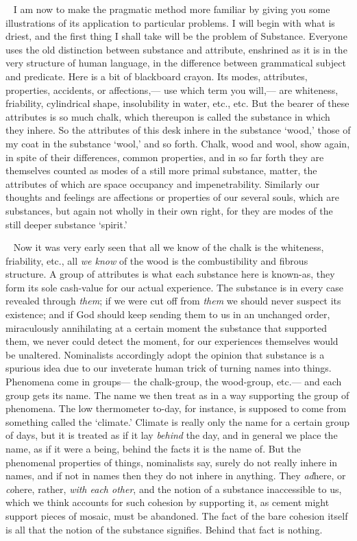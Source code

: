 \documentclass[12pt]{article}
\newcounter{wjparagraph}[section]
\newcommand*{\wjparagraph}{\stepcounter{wjparagraph}~\marginpar{\tiny\arabic{wjparagraph} }}
\begin{document}
\wjparagraph
I am now to make the pragmatic method more familiar by giving you some illustrations of its application to particular problems. I will begin with what is driest, and the first thing I shall take will be the problem of Substance. Everyone uses the old distinction between substance and attribute, enshrined as it is in the very structure of human language, in the difference between grammatical subject and predicate. Here is a bit of blackboard crayon. Its modes, attributes, properties, accidents, or affections,--- use which term you will,--- are whiteness, friability, cylindrical shape, insolubility in water, etc., etc. But the bearer of these attributes is so much chalk, which thereupon is called the substance in which they inhere. So the attributes of this desk inhere in the substance `wood,' those of my coat in the substance `wool,' and so forth. Chalk, wood and wool, show again, in spite of their differences, common properties, and in so far forth they are themselves counted as modes of a still more primal substance, matter, the attributes of which are space occupancy and impenetrability. Similarly our thoughts and feelings are affections or properties of our several souls, which are substances, but again not wholly in their own right, for they are modes of the still deeper substance `spirit.'

\wjparagraph
Now it was very early seen that all we know of the chalk is the whiteness, friability, etc., all \emph{we know} of the wood is the combustibility and fibrous structure. A group of attributes is what each substance here is known-as, they form its sole cash-value for our actual experience. The substance is in every case revealed through \emph{them}; if we were cut off from \emph{them} we should never suspect its existence; and if God should keep sending them to us in an unchanged order, miraculously annihilating at a certain moment the substance that supported them, we never could detect the moment, for our experiences themselves would be unaltered. Nominalists accordingly adopt the opinion that substance is a spurious idea due to our inveterate human trick of turning names into things. Phenomena come in groups--- the chalk-group, the wood-group, etc.--- and each group gets its name. The name we then treat as in a way supporting the group of phenomena. The low thermometer to-day, for instance, is supposed to come from something called the `climate.' Climate is really only the name for a certain group of days, but it is treated as if it lay \emph{behind} the day, and in general we place the name, as if it were a being, behind the facts it is the name of. But the phenomenal properties of things, nominalists say, surely do not really inhere in names, and if not in names then they do not inhere in anything. They \emph{ad}here, or \emph{co}here, rather, \emph{with each other}, and the notion of a substance inaccessible to us, which we think accounts for such cohesion by supporting it, as cement might support pieces of mosaic, must be abandoned. The fact of the bare cohesion itself is all that the notion of the substance signifies. Behind that fact is nothing.
\end{document}
